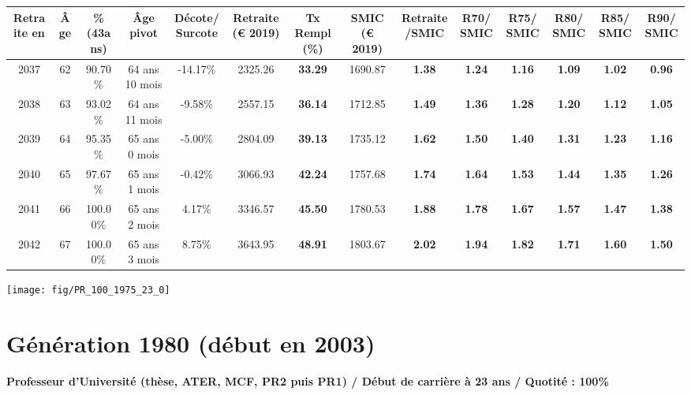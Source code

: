 \begin{adjustbox}{max width=\textwidth} 
\begin{tabular}[htb]{|c|c||c|c|c||c|c||c|c||c|c|c|c|c|} 
\hline 
 Retraite en &  Âge &  \%(43ans) &  Âge pivot &  Décote/Surcote &  Retraite (\euro{} 2019) &  Tx Rempl(\%) &  SMIC (\euro{} 2019) &  Retraite/SMIC &  R70/SMIC &  R75/SMIC &  R80/SMIC &  R85/SMIC &  R90/SMIC \\ 
\hline \hline 
 2037 &  62 &  90.70\% &  64 ans 10 mois &  -14.17\% &  2325.26 &  {\bf 33.29} &  1690.87 &  {\bf 1.38} &  {\bf 1.24} &  {\bf 1.16} &  {\bf 1.09} &  {\bf 1.02} &  {\bf {\color{red} 0.96}} \\ 
\hline 
 2038 &  63 &  93.02\% &  64 ans 11 mois &  -9.58\% &  2557.15 &  {\bf 36.14} &  1712.85 &  {\bf 1.49} &  {\bf 1.36} &  {\bf 1.28} &  {\bf 1.20} &  {\bf 1.12} &  {\bf 1.05} \\ 
\hline 
 2039 &  64 &  95.35\% &  65 ans 0 mois &  -5.00\% &  2804.09 &  {\bf 39.13} &  1735.12 &  {\bf 1.62} &  {\bf 1.50} &  {\bf 1.40} &  {\bf 1.31} &  {\bf 1.23} &  {\bf 1.16} \\ 
\hline 
 2040 &  65 &  97.67\% &  65 ans 1 mois &  -0.42\% &  3066.93 &  {\bf 42.24} &  1757.68 &  {\bf 1.74} &  {\bf 1.64} &  {\bf 1.53} &  {\bf 1.44} &  {\bf 1.35} &  {\bf 1.26} \\ 
\hline 
 2041 &  66 &  100.00\% &  65 ans 2 mois &  4.17\% &  3346.57 &  {\bf 45.50} &  1780.53 &  {\bf 1.88} &  {\bf 1.78} &  {\bf 1.67} &  {\bf 1.57} &  {\bf 1.47} &  {\bf 1.38} \\ 
\hline 
 2042 &  67 &  100.00\% &  65 ans 3 mois &  8.75\% &  3643.95 &  {\bf 48.91} &  1803.67 &  {\bf 2.02} &  {\bf 1.94} &  {\bf 1.82} &  {\bf 1.71} &  {\bf 1.60} &  {\bf 1.50} \\ 
\hline 
\hline 
\end{tabular} 
\end{adjustbox} 
 
 \vspace{0.1cm} 

 {\hspace{-2.2cm}\texttt{[image: fig/PR\_100\_1975\_23\_0]}} 

\newpage 
 
\section{Génération 1980 (début en 2003)\label{PR_100_1980_23_0}} 
 
{\bf \noindent Professeur d'Université (thèse, ATER, MCF, PR2 puis PR1) / Début de carrière à 23 ans / Quotité : 100\%}  ~ 


